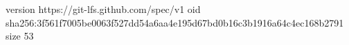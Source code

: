 version https://git-lfs.github.com/spec/v1
oid sha256:3f561f7005be0063f527dd54a6aa4e195d67bd0b16c3b1916a64c4ec168b2791
size 53

